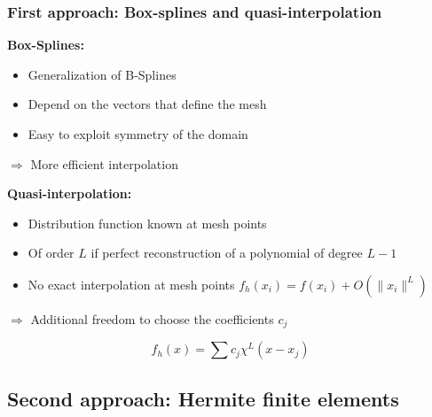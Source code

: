 \documentclass[]{beamer}
\begin{document}
\begin{frame}
	\frametitle{First approach: Box-splines and quasi-interpolation}
	\textbf{Box-Splines:}
	\begin{itemize}
		\item	Generalization of B-Splines
		\item Depend on the vectors that define the mesh
		\item Easy to exploit symmetry of the domain\vspace{0.2cm}
	\end{itemize}
	
	$\Rightarrow$ More efficient interpolation\vspace{0.2cm}

	\textbf{Quasi-interpolation:}
	\begin{itemize}
		\item Distribution function known at mesh points
		\item Of order $L$ if perfect reconstruction of a polynomial of degree $L - 1$
		\item No exact interpolation at mesh points $f_h(x_i) =  f(x_i)+O(\|x_i\| ^L)$\vspace{0.2cm}
	\end{itemize}
	
	$\Rightarrow$ Additional freedom to choose the coefficients $c_j$

	\begin{equation}
	f_h (x) = \sum c_j \chi^L (x - x_j)
	\end{equation}
\end{frame}


\subsection{Second approach: Hermite finite elements}
\end{document}
